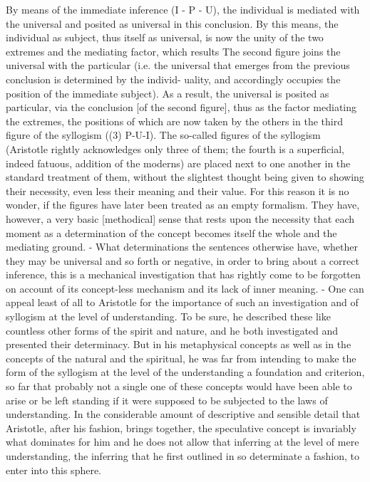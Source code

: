 By means of the immediate inference (I - P - U), the individual is
mediated with the universal and posited as universal in this conclusion.
By this means, the individual as subject, thus itself as universal,
is now the unity of the two extremes and the mediating factor, which results
The second figure joins the universal with the particular (i.e. the universal
that emerges from the previous conclusion is determined by the individ-
uality, and accordingly occupies the position of the immediate subject).
As a result, the universal is posited as particular, via the conclusion [of the
second figure], thus as the factor mediating the extremes, the positions of
which are now taken by the others in the third figure of the syllogism ((3)
P-U-I).
The so-called figures of the syllogism (Aristotle rightly acknowledges
only three of them; the fourth is a superficial, indeed fatuous,
addition of the moderns) are placed next to one another in the
standard treatment of them, without the slightest thought being
given to showing their necessity, even less their meaning and their
value. For this reason it is no wonder, if the figures have later been
treated as an empty formalism. They have, however, a very basic
[methodical] sense that rests upon the necessity that each moment as
a determination of the concept becomes itself the whole and the
mediating ground. - What determinations the sentences otherwise
have, whether they may be universal and so forth or negative,
in order to bring about a correct inference, this is a mechanical
investigation that has rightly come to be forgotten on account of
its concept-less mechanism and its lack of inner meaning. - One
can appeal least of all to Aristotle for the importance of such an
investigation and of syllogism at the level of understanding. To be
sure, he described these like countless other forms of the spirit and
nature, and he both investigated and presented their determinacy.
But in his metaphysical concepts as well as in the concepts of the
natural and the spiritual, he was far from intending to make the
form of the syllogism at the level of the understanding a foundation
and criterion, so far that probably not a single one of these concepts
would have been able to arise or be left standing if it were supposed
to be subjected to the laws of understanding. In the considerable
amount of descriptive and sensible detail that
Aristotle, after his fashion, brings together, the speculative concept is
invariably what dominates for him and he does not allow that
inferring at the level of mere understanding, the inferring that he
first outlined in so determinate a fashion, to enter into this sphere.


